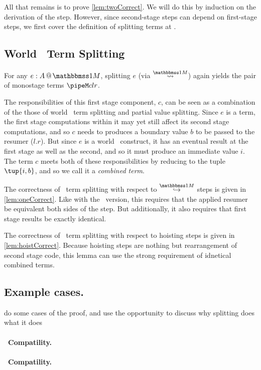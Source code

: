 \begin{abstrsyn}
All that remains is to prove \ref{lem:twoCorrect}.  
We will do this by induction on the derivation of the step.
However, since second-stage steps can depend on first-stage steps,
we first cover the definition of splitting terms at \bbonem.

\subsection{World \bbonem\ Term Splitting}

For any $\colmix e A$, 
splitting $e$ (via $\splitonesym$) again 
yields the pair of monostage terms $\pipeM c l r$. 

The responsibilities of this first stage component, $c$, can be seen as a combination of the
those of world \bbtwo\ term splitting and partial value splitting.
Since $e$ is a term, the first stage computations within it may yet still
affect its second stage computations,
and so $c$ needs to produces a boundary value $b$ to be passed to the resumer ($l.r$).
But since $e$ is a world \bbonem\ construct, it has an eventual result at the 
first stage as well as the second, and so it must produce an immediate value $i$.
The term $c$ meets both of these responsibilities by reducing to the tuple $\tup{i,b}$,
and so we call it a {\em combined term}.

The correctness of \bbonem\ term splitting with respect to $\stepsym \bbonem$ steps is given in \ref{lem:oneCorrect}.
Like with the \bbtwo\ version, this requires that the applied resumer be equivalent both sides of the step.
But additionally, it also requires that first stage results be exactly identical.

The correctness of \bbonem\ term splitting with respect to hoisting steps is given in \ref{lem:hoistCorrect}.
Because hoisting steps are nothing but rearrangement of second stage code,
this lemma can use the strong requirement of idnetical combined terms.

\subsection{Example cases.}

\TODO do some cases of the proof, and use the opportunity to discuss why splitting does what it does

\paragraph{\bbtwo\ Compatility.}
\paragraph{\bbone\ Compatility.}

\end{abstrsyn}
